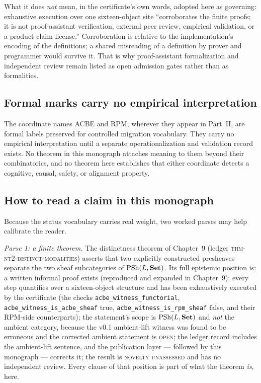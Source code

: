 What it does \emph{not} mean, in the certificate's own words, adopted here
as governing: exhaustive execution over one sixteen-object site
``corroborates the finite proofs; it is not proof-assistant verification,
external peer review, empirical validation, or a product-claim license.''
Corroboration is relative to the implementation's encoding of the
definitions; a shared misreading of a definition by prover and programmer
would survive it. That is why proof-assistant formalization and independent
review remain listed as open admission gates rather than as formalities.

\subsection{Formal marks carry no empirical
interpretation}\label{ch01:sec:marks-boundary}

\begin{boundary}\label{ch01:bdy:marks}
The coordinate names ACBE and RPM, wherever they appear in Part~II, are
formal labels preserved for controlled migration vocabulary. They carry no
empirical interpretation until a separate operationalization and validation
record exists. No theorem in this monograph attaches meaning to them beyond
their combinatorics, and no theorem here establishes that either coordinate
detects a cognitive, causal, safety, or alignment property.
\end{boundary}

\subsection{How to read a claim in this monograph}\label{ch01:sec:reading-claims}

Because the status vocabulary carries real weight, two worked parses may
help calibrate the reader.

\emph{Parse 1: a finite theorem.} The distinctness theorem of Chapter~9
(ledger \textsc{thm-nt2-distinct-modalities}) asserts that two explicitly
constructed presheaves separate the two sheaf subcategories of
$\mathrm{PSh}(L, \mathbf{Set})$. Its full epistemic position is: a written informal proof
exists (reproduced and expanded in Chapter~9); every step quantifies over
a sixteen-object structure and has been exhaustively executed by the
certificate (the checks \texttt{acbe\_witness\_functorial},
\texttt{acbe\_witness\_is\_acbe\_sheaf} true,
\texttt{acbe\_witness\_is\_rpm\_sheaf} false, and their RPM-side
counterparts); the statement's scope is $\mathrm{PSh}(L, \mathbf{Set})$ and \emph{not} the
ambient category, because the v0.1 ambient-lift witness was found to be
erroneous and the corrected ambient statement is \textsc{open}; the ledger
record includes the ambient-lift sentence, and the publication layer ---
followed by this monograph --- corrects it; the result is
\textsc{novelty unassessed} and has no independent review. Every clause of
that position is part of what the theorem \emph{is}, here.

